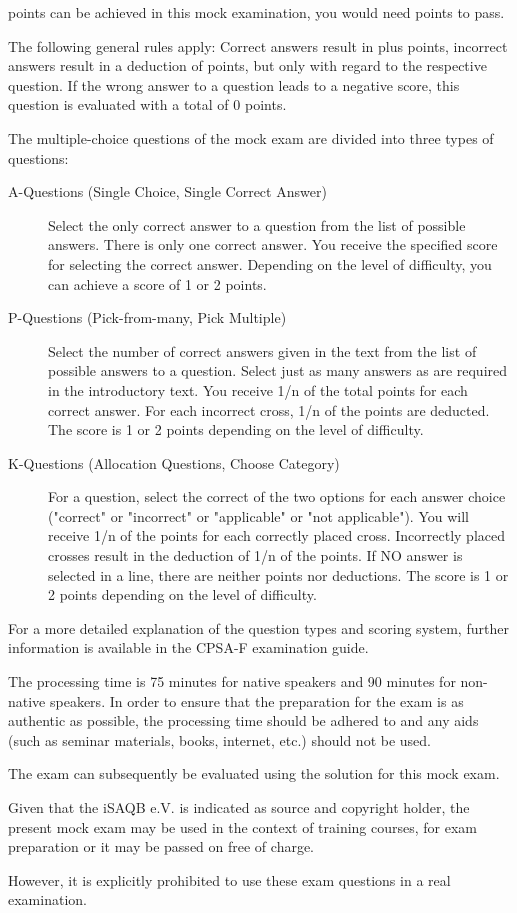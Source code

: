 \documentclass[12pt,a4paper]{article}
\begin{document}
\examTotalPoints{} points can be achieved in this mock examination,
you would need \examMinPoints{} points to pass.

The following general rules apply: Correct answers result in plus
points, incorrect answers result in a deduction of points, but only
with regard to the respective question. If the wrong answer to a
question leads to a negative score, this question is evaluated with a
total of 0 points.

The multiple-choice questions of the mock exam are divided into three
types of questions:

\begin{description}
\item[A-Questions (Single Choice, Single Correct Answer)] Select the
  only correct answer to a question from the list of possible
  answers. There is only one correct answer. You receive the specified
  score for selecting the correct answer. Depending on the level of
  difficulty, you can achieve a score of 1 or 2 points.
\item[P-Questions (Pick-from-many, Pick Multiple)] Select the number
  of correct answers given in the text from the list of possible
  answers to a question. Select just as many answers as are required
  in the introductory text. You receive 1/n of the total points for
  each correct answer. For each incorrect cross, 1/n of the points are
  deducted. The score is 1 or 2 points depending on the level of
  difficulty.
\item[K-Questions (Allocation Questions, Choose Category)] For a
  question, select the correct of the two options for each answer
  choice ("correct" or "incorrect" or "applicable" or "not
  applicable"). You will receive 1/n of the points for each correctly
  placed cross. Incorrectly placed crosses result in the deduction of
  1/n of the points. If NO answer is selected in a line, there are
  neither points nor deductions. The score is 1 or 2 points depending
  on the level of difficulty.
\end{description}

For a more detailed explanation of the question types and scoring
system, further information is available in the CPSA-F examination
guide.

The processing time is 75 minutes for native speakers and 90 minutes
for non-native speakers. In order to ensure that the preparation for
the exam is as authentic as possible, the processing time should be
adhered to and any aids (such as seminar materials, books, internet,
etc.) should not be used.

The exam can subsequently be evaluated using the solution for this
mock exam.

Given that the iSAQB\registered{} e.V. is indicated as source and copyright
holder, the present mock exam may be used in the context of training
courses, for exam preparation or it may be passed on free of charge.

However, it is explicitly prohibited to use these exam questions in a
real examination.

\newpage

\setcounter{examQuestion}{1}

\end{document}
